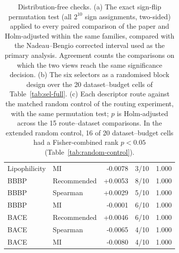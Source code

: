 \begin{table}[H]
\begin{tabular}{llrrr}
Lipophilicity & MI & -0.0078 & 3/10 & 1.000 \\
BBBP & Recommended & +0.0053 & 8/10 & 1.000 \\
BBBP & Spearman & +0.0029 & 5/10 & 1.000 \\
BBBP & MI & -0.0001 & 6/10 & 1.000 \\
BACE & Recommended & +0.0046 & 6/10 & 1.000 \\
BACE & Spearman & -0.0065 & 4/10 & 1.000 \\
BACE & MI & -0.0080 & 4/10 & 1.000 \\
\bottomrule
\end{tabular}
\caption{Distribution-free checks. (a) The exact sign-flip permutation test (all $2^{10}$ sign assignments, two-sided) applied to every paired comparison of the paper and Holm-adjusted within the same families, compared with the Nadeau--Bengio corrected interval used as the primary analysis. Agreement counts the comparisons on which the two views reach the same significance decision. (b) The six selectors as a randomised block design over the 20 dataset--budget cells of Table~\ref{tab:sel-full}. (c) Each descriptor route against the matched random control of the routing experiment, with the same permutation test; $p$ is Holm-adjusted across the 15 route--dataset comparisons. In the extended random control, 16 of 20 dataset--budget cells had a Fisher-combined rank $p<0.05$ (Table~\ref{tab:random-control}).}
\label{tab:robustness}
\end{table}

